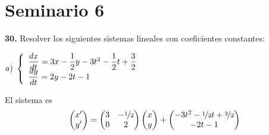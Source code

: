 \section{Seminario 6}
\begin{ejer}
    \textbf{30.} Resolver los siguientes sistemas lineales con coeficientes constantes:
    
    $a) \; \left\{ \begin{array}{l}
         \dfrac{dx}{dt}=3x-\dfrac{1}{2}y-3t^2-\dfrac{1}{2}t+\dfrac{3}{2}  \\
         \vspace{-5mm} \\
         \dfrac{dy}{dt}=2y-2t-1
    \end{array} \right.$
    \begin{sol} El sistema es
        $$\begin{pmatrix}
            x' \\ y'
        \end{pmatrix}=\begin{pmatrix}
            3 & -\nicefrac{1}{2} \\
            0 & 2
        \end{pmatrix}\begin{pmatrix}
            x \\ y
        \end{pmatrix}+\begin{pmatrix}
            -3t^2-\nicefrac{1}{2}t+\nicefrac{3}{2} \\ -2t-1
        \end{pmatrix}$$


\end{sol}
\end{ejer}
